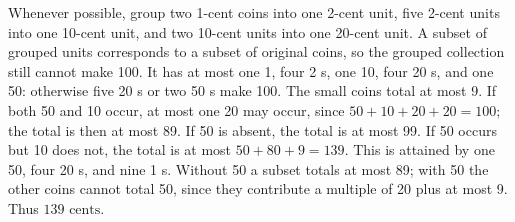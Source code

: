 Whenever possible, group two 1-cent coins into one 2-cent unit, five 2-cent units into one 10-cent unit, and two 10-cent units into one 20-cent unit. A subset of grouped units corresponds to a subset of original coins, so the grouped collection still cannot make 100. It has at most one 1, four 2 s, one 10, four 20 s, and one 50: otherwise five 20 s or two 50 s make 100. The small coins total at most 9. If both 50 and 10 occur, at most one 20 may occur, since $50+10+20+20=100$; the total is then at most 89. If 50 is absent, the total is at most 99. If 50 occurs but 10 does not, the total is at most $50+80+9=139$. This is attained by one 50, four 20 s, and nine 1 s. Without 50 a subset totals at most 89; with 50 the other coins cannot total 50, since they contribute a multiple of 20 plus at most 9. Thus $\boxed{139\text{ cents}}$.
